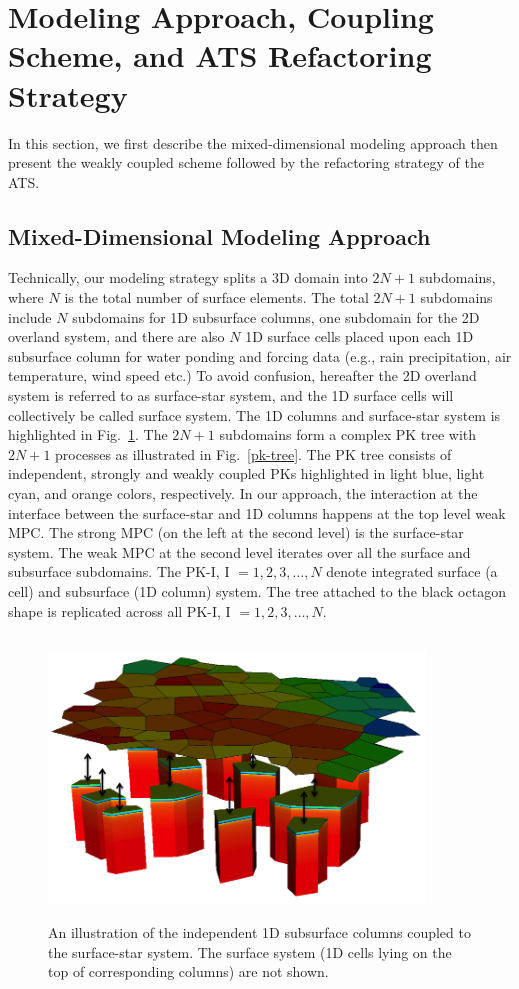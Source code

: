 \documentclass[review]{elsarticle}
\begin{document}
\section{Modeling Approach, Coupling Scheme, and ATS Refactoring Strategy}\label{mixed-dim-model}

In this section, we first describe the mixed-dimensional modeling approach then present the weakly coupled scheme followed by the refactoring strategy of the ATS.
\subsection{Mixed-Dimensional Modeling Approach}
Technically, our modeling strategy splits a 3D domain into $2N+1$ subdomains, where $N$ is the total number of surface elements. The total $2N+1$ subdomains include $N$ subdomains for 1D subsurface columns, one subdomain for the 2D overland system, and there are also $N$ 1D surface cells placed upon each 1D subsurface column for water ponding and forcing data (e.g., rain precipitation, air temperature, wind speed etc.) To avoid confusion, hereafter the 2D overland system is referred to as surface-star system, and the 1D surface cells will collectively be called surface system. The 1D columns and surface-star system is highlighted in Fig.~\ref{surf-cols}. The $2N+1$ subdomains form a complex PK tree with $2N+1$ processes as illustrated in Fig.~\ref{pk-tree}. The PK tree consists of independent, strongly and weakly coupled PKs highlighted in light blue, light cyan, and orange colors, respectively. In our approach, the interaction at the interface between the surface-star and 1D columns happens at the top level weak MPC. The strong MPC (on the left at the second level) is the surface-star system. The weak MPC at the second level iterates over all the surface and subsurface subdomains. The PK-I, I $=1,2,3, \dots, N$ denote integrated surface (a cell) and subsurface (1D column) system. The tree attached to the black octagon shape is replicated across all PK-I, I $=1,2,3, \dots, N$.

\begin{figure}[!htpb]
\centering
\includegraphics[height = 7.5cm, width=10cm]{figures/mixed-dim-model.png}
\caption{An illustration of the independent 1D subsurface columns coupled to the surface-star system. The surface system (1D cells lying on the top of corresponding columns) are not shown.}
\label{surf-cols}
\end{figure}
\end{document}
